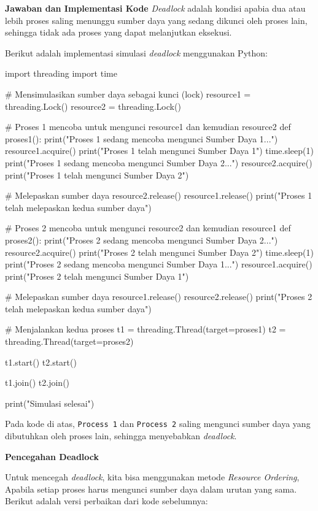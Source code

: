 \documentclass[12pt]{article}
\begin{document}
\textbf{Jawaban dan Implementasi Kode}
\vspace{0.5cm}
\textit{Deadlock} adalah kondisi apabia dua atau lebih proses saling menunggu sumber daya yang sedang dikunci oleh proses lain, sehingga tidak ada proses yang dapat melanjutkan eksekusi.

Berikut adalah implementasi simulasi \textit{deadlock} menggunakan Python:

\begin{python}  
import threading
import time

# Mensimulasikan sumber daya sebagai kunci (lock)
resource1 = threading.Lock()
resource2 = threading.Lock()

# Proses 1 mencoba untuk mengunci resource1 dan kemudian resource2
def proses1():
    print("Proses 1 sedang mencoba mengunci Sumber Daya 1...")
    resource1.acquire()
    print("Proses 1 telah mengunci Sumber Daya 1")
    time.sleep(1)
    print("Proses 1 sedang mencoba mengunci Sumber Daya 2...")
    resource2.acquire()
    print("Proses 1 telah mengunci Sumber Daya 2")
    
    # Melepaskan sumber daya
    resource2.release()
    resource1.release()
    print("Proses 1 telah melepaskan kedua sumber daya")

# Proses 2 mencoba untuk mengunci resource2 dan kemudian resource1
def proses2():
    print("Proses 2 sedang mencoba mengunci Sumber Daya 2...")
    resource2.acquire()
    print("Proses 2 telah mengunci Sumber Daya 2")
    time.sleep(1)
    print("Proses 2 sedang mencoba mengunci Sumber Daya 1...")
    resource1.acquire()
    print("Proses 2 telah mengunci Sumber Daya 1")
    
    # Melepaskan sumber daya
    resource1.release()
    resource2.release()
    print("Proses 2 telah melepaskan kedua sumber daya")

# Menjalankan kedua proses
t1 = threading.Thread(target=proses1)
t2 = threading.Thread(target=proses2)

t1.start()
t2.start()

t1.join()
t2.join()

print("Simulasi selesai")
\end{python}

Pada kode di atas, \texttt{Process 1} dan \texttt{Process 2} saling mengunci sumber daya yang dibutuhkan oleh proses lain, sehingga menyebabkan \textit{deadlock}.

\textbf{Pencegahan Deadlock}

Untuk mencegah \textit{deadlock}, kita bisa menggunakan metode \textit{Resource Ordering}, Apabila setiap proses harus mengunci sumber daya dalam urutan yang sama. Berikut adalah versi perbaikan dari kode sebelumnya:
\end{document}
